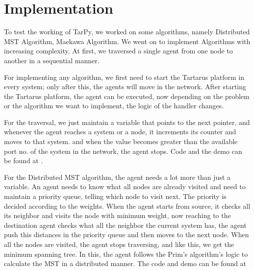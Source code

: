 \chapter{Implementation} \label{Implementation}

\large
To test the working of TarPy, we worked on some algorithms, namely Distributed MST Algorithm, Maekawa Algorithm. We went on to implement Algorithms with increasing complexity. At first, we traversed a single agent from one node to another in a sequential manner.\par

\bigbreak
For implementing any algorithm, we first need to start the Tartarus platform in every system; only after this, the agents will move in the network. After starting the Tartarus platform, the agent can be executed, now depending on the problem or the algorithm we want to implement, the logic of the handler changes.\par

\bigbreak
For the traversal, we just maintain a variable that points to the next pointer, and whenever the agent reaches a system or a node, it increments its counter and moves to that system. and when the value becomes greater than the available port no. of the system in the network, the agent stops. Code and the demo can be found at \cite{3node}.

\bigbreak 
For the Distributed MST algorithm, the agent needs a lot more than just a variable. An agent needs to know what all nodes are already visited and need to maintain a priority queue, telling which node to visit next. The priority is decided according to the weights. When the agent starts from source, it checks all its neighbor and visits the node with minimum weight, now reaching to the destination agent checks what all the neighbor the current system has, the agent push this distances in the priority queue and then moves to the next node. When all the nodes are visited, the agent stops traversing, and like this, we get the minimum spanning tree. In this, the agent follows the Prim's algorithm's logic to calculate the MST in a distributed manner. The code and demo can be found at \cite{distmst}\par